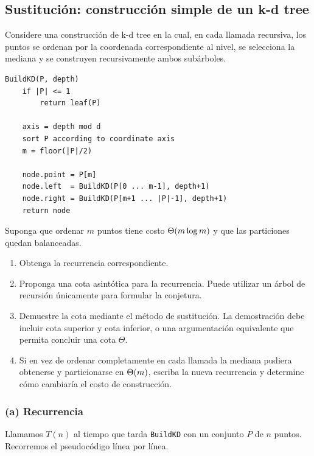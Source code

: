 \subsection{Sustitución: construcción simple de un k-d tree}
\label{sec:act3-2}

\begin{enunciado}
Considere una construcción de k-d tree en la cual, en cada llamada recursiva, los puntos
se ordenan por la coordenada correspondiente al nivel, se selecciona la mediana y se
construyen recursivamente ambos subárboles.
\begin{lstlisting}[language={}, numbers=none, frame=none, backgroundcolor={}]
BuildKD(P, depth)
    if |P| <= 1
        return leaf(P)

    axis = depth mod d
    sort P according to coordinate axis
    m = floor(|P|/2)

    node.point = P[m]
    node.left  = BuildKD(P[0 ... m-1], depth+1)
    node.right = BuildKD(P[m+1 ... |P|-1], depth+1)
    return node
\end{lstlisting}
Suponga que ordenar $m$ puntos tiene costo $\Theta\!\left(m \log m\right)$ y que las particiones quedan
balanceadas.
\begin{enumerate}[label=(\alph*)]
  \item Obtenga la recurrencia correspondiente.
  \item Proponga una cota asintótica para la recurrencia. Puede utilizar un árbol de
        recursión únicamente para formular la conjetura.
  \item Demuestre la cota mediante el método de sustitución. La demostración debe incluir
        cota superior y cota inferior, o una argumentación equivalente que permita concluir
        una cota $\Theta$.
  \item Si en vez de ordenar completamente en cada llamada la mediana pudiera obtenerse y
        particionarse en $\Theta\!\left(m\right)$, escriba la nueva recurrencia y determine cómo cambiaría
        el costo de construcción.
\end{enumerate}
\end{enunciado}

\subsubsection*{(a) Recurrencia}

Llamamos $T(n)$ al tiempo que tarda \texttt{BuildKD} con un conjunto $P$ de $n$ puntos.
Recorremos el pseudocódigo línea por línea.

